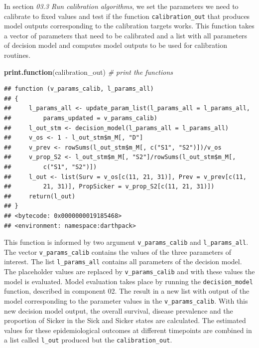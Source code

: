 \documentclass[]{book}
\newenvironment{Shaded}{\begin{snugshade}}{\end{snugshade}}
\newcommand{\CommentTok}[1]{\textcolor[rgb]{0.56,0.35,0.01}{\textit{#1}}}
\newcommand{\KeywordTok}[1]{\textcolor[rgb]{0.13,0.29,0.53}{\textbf{#1}}}
\newcommand{\NormalTok}[1]{#1}
\begin{document}
In section \emph{03.3 Run calibration algorithms}, we set the parameters we need to calibrate to fixed values and test if the function \texttt{calibration\_out} that produces model outputs corresponding to the calibration targets works. This function takes a vector of parameters that need to be calibrated and a list with all parameters of decision model and computes model outputs to be used for calibration routines.

\begin{Shaded}
\begin{Highlighting}[]
\KeywordTok{print.function}\NormalTok{(calibration_out) }\CommentTok{# print the functions}
\end{Highlighting}
\end{Shaded}

\begin{verbatim}
## function (v_params_calib, l_params_all) 
## {
##     l_params_all <- update_param_list(l_params_all = l_params_all, 
##         params_updated = v_params_calib)
##     l_out_stm <- decision_model(l_params_all = l_params_all)
##     v_os <- 1 - l_out_stm$m_M[, "D"]
##     v_prev <- rowSums(l_out_stm$m_M[, c("S1", "S2")])/v_os
##     v_prop_S2 <- l_out_stm$m_M[, "S2"]/rowSums(l_out_stm$m_M[, 
##         c("S1", "S2")])
##     l_out <- list(Surv = v_os[c(11, 21, 31)], Prev = v_prev[c(11, 
##         21, 31)], PropSicker = v_prop_S2[c(11, 21, 31)])
##     return(l_out)
## }
## <bytecode: 0x0000000019185468>
## <environment: namespace:darthpack>
\end{verbatim}

This function is informed by two argument \texttt{v\_params\_calib} and \texttt{l\_params\_all}. The vector \texttt{v\_params\_calib} contains the values of the three parameters of interest. The list \texttt{l\_params\_all} contains all parameters of the decision model. The placeholder values are replaced by \texttt{v\_params\_calib} and with these values the model is evaluated. Model evaluation takes place by running the \texttt{decision\_model} function, described in component 02. The result in a new list with output of the model corresponding to the parameter values in the \texttt{v\_params\_calib}. With this new decision model output, the overall survival, disease prevalence and the proportion of Sicker in the Sick and Sicker states are calculated. The estimated values for these epidemiological outcomes at different timepoints are combined in a list called \texttt{l\_out} produced but the \texttt{calibration\_out}.
\end{document}
